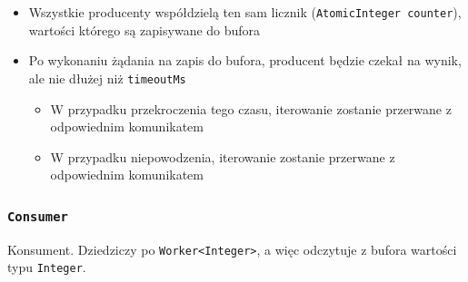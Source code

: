 \documentclass[11pt]{article}
\providecommand{\tightlist}{%
      \setlength{\itemsep}{0pt}\setlength{\parskip}{0pt}}
\begin{document}
\begin{itemize}
\tightlist
\item
  Wszystkie producenty współdzielą ten sam licznik
  (\texttt{AtomicInteger\ counter}), wartości którego są zapisywane do
  bufora
\item
  Po wykonaniu żądania na zapis do bufora, producent będzie czekał na
  wynik, ale nie dłużej niż \texttt{timeoutMs}

  \begin{itemize}
  \tightlist
  \item
    W przypadku przekroczenia tego czasu, iterowanie zostanie przerwane
    z odpowiednim komunikatem
  \item
    W przypadku niepowodzenia, iterowanie zostanie przerwane z
    odpowiednim komunikatem
  \end{itemize}
\end{itemize}

    \hypertarget{consumer}{%
\subsubsection{\texorpdfstring{\texttt{Consumer}}{Consumer}}\label{consumer}}

Konsument. Dziedziczy po
\texttt{Worker\textless{}Integer\textgreater{}}, a więc odczytuje z
bufora wartości typu \texttt{Integer}.
\end{document}
